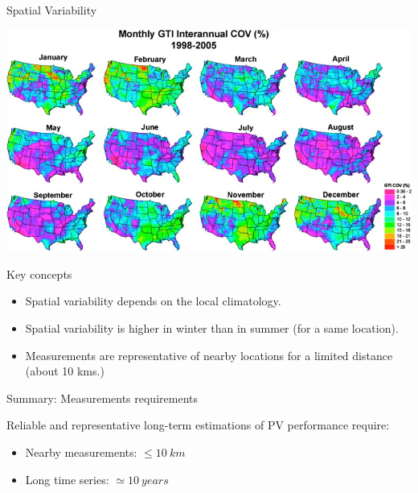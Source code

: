 \documentclass[xcolor={usenames,svgnames,dvipsnames}]{beamer}
\begin{document}
\begin{frame}[label={sec:orgec2973c}]{Spatial Variability}
\begin{center}
\includegraphics[height=0.4\textheight]{../figs/SpatialVariability.jpg}
\end{center}

\begin{block}{Key concepts}
\begin{itemize}
\item Spatial variability depends on the \alert{local climatology}.
\item Spatial variability is \alert{higher in winter than in summer} (for a same location).
\item Measurements are representative of nearby locations for a \alert{limited distance} (about 10 kms.)
\end{itemize}
\end{block}
\end{frame}

\begin{frame}[label={sec:org204fda5}]{Summary: Measurements requirements}
\begin{block}{}
\alert{Reliable} and \alert{representative} \alert{long-term estimations} of PV performance require:
\begin{itemize}
\item \alert{Nearby measurements}: \(\leq \SI{10}{km}\)
\item \alert{Long time series}: \(\simeq \SI{10}{years}\)
\end{itemize}
\end{block}
\end{frame}
\end{document}
